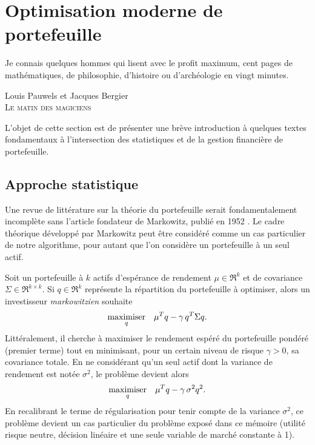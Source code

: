 \section{Optimisation moderne de portefeuille}
\label{sec:review}

\epigraph{Je connais quelques hommes qui lisent avec le profit maximum, cent pages de
  mathématiques, de philosophie, d’histoire ou d’archéologie en vingt minutes.}{Louis
  Pauwels et Jacques Bergier\\\textsc{Le matin des magiciens}}

L'objet de cette section est de présenter une brève introduction à quelques textes
fondamentaux à l'intersection des statistiques et de la gestion financière de
portefeuille.


\subsection{Approche statistique}

Une revue de littérature sur la théorie du portefeuille serait fondamentalement incomplète
sans l'article fondateur de Markowitz, publié en 1952 \cite{markowitz1952portfolio}. Le
cadre théorique développé par Markowitz peut être considéré comme un cas particulier de
notre algorithme, pour autant que l'on considère un portefeuille à un seul actif.

Soit un portefeuille à $k$ actifs d'espérance de rendement $\mu\in\Re^k$ et de covariance
$\Sigma \in \Re^{k\times k}$. Si $q \in \Re^k$ représente la répartition du portefeuille à optimiser, alors
un investisseur \textit{markowitzien} souhaite
\begin{equation}
  \label{rev:marko}
  \maximizeEquation[q]{\mu^Tq - \gamma\,q^T\Sigma q.}
\end{equation}
Littéralement, il cherche à maximiser le rendement espéré du portefeuille pondéré (premier
terme) tout en minimisant, pour un certain niveau de risque $\gamma>0$, sa covariance
totale. En ne considérant qu'un seul actif dont la variance de rendement est notée $\sigma^2$,
le problème devient alors
\begin{equation}
  \maximizeEquation[q]{\mu^Tq - \gamma\,\sigma^2 q^2.}
\end{equation}
En recalibrant le terme de régularisation pour tenir compte de la variance $\sigma^2$, ce
problème devient un cas particulier du problème exposé dans ce mémoire (utilité risque
neutre, décision linéaire et une seule variable de marché constante à 1).

